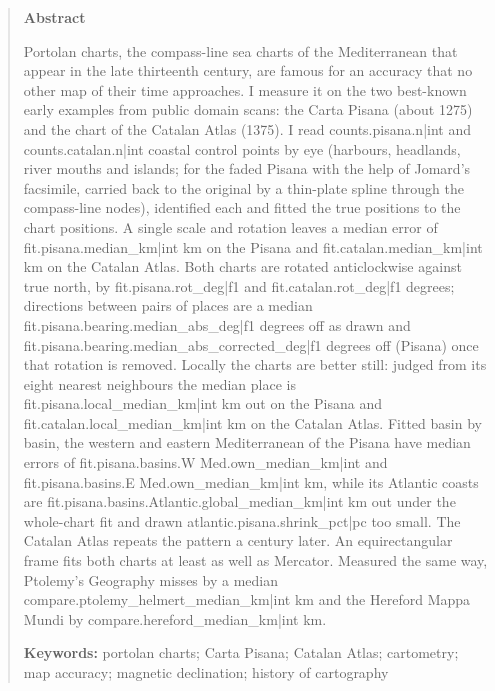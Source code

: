 \documentclass[11pt,a4paper]{article}
\begin{document}
\begin{quote}
\small
\begin{center}\textbf{Abstract}\end{center}
Portolan charts, the compass-line sea charts of the Mediterranean that appear in the late thirteenth century, are famous for an accuracy that no other map of their time approaches. I measure it on the two best-known early examples from public domain scans: the Carta Pisana (about 1275) and the chart of the Catalan Atlas (1375). I read {{counts.pisana.n|int}} and {{counts.catalan.n|int}} coastal control points by eye (harbours, headlands, river mouths and islands; for the faded Pisana with the help of Jomard's facsimile, carried back to the original by a thin-plate spline through the compass-line nodes), identified each and fitted the true positions to the chart positions. A single scale and rotation leaves a median error of {{fit.pisana.median_km|int}} km on the Pisana and {{fit.catalan.median_km|int}} km on the Catalan Atlas. Both charts are rotated anticlockwise against true north, by {{fit.pisana.rot_deg|f1}} and {{fit.catalan.rot_deg|f1}} degrees; directions between pairs of places are a median {{fit.pisana.bearing.median_abs_deg|f1}} degrees off as drawn and {{fit.pisana.bearing.median_abs_corrected_deg|f1}} degrees off (Pisana) once that rotation is removed. Locally the charts are better still: judged from its eight nearest neighbours the median place is {{fit.pisana.local_median_km|int}} km out on the Pisana and {{fit.catalan.local_median_km|int}} km on the Catalan Atlas. Fitted basin by basin, the western and eastern Mediterranean of the Pisana have median errors of {{fit.pisana.basins.W Med.own_median_km|int}} and {{fit.pisana.basins.E Med.own_median_km|int}} km, while its Atlantic coasts are {{fit.pisana.basins.Atlantic.global_median_km|int}} km out under the whole-chart fit and drawn {{atlantic.pisana.shrink_pct|pc}} too small. The Catalan Atlas repeats the pattern a century later. An equirectangular frame fits both charts at least as well as Mercator. Measured the same way, Ptolemy's Geography misses by a median {{compare.ptolemy_helmert_median_km|int}} km and the Hereford Mappa Mundi by {{compare.hereford_median_km|int}} km.

\textbf{Keywords:} portolan charts; Carta Pisana; Catalan Atlas; cartometry; map accuracy; magnetic declination; history of cartography
\end{quote}
\end{document}
